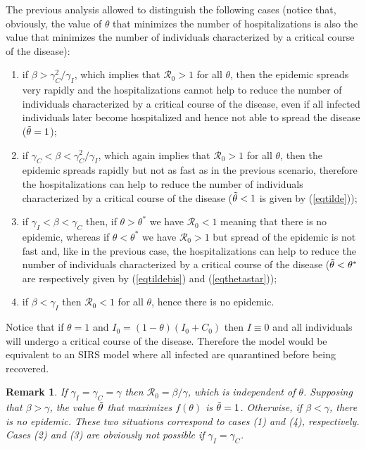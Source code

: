\documentclass[11pt,reqno]{amsart}
\theoremstyle{boldremark}
\newtheorem{remark}{Remark}
\begin{document}
The previous analysis allowed to distinguish the following cases (notice that, obviously, the value of $\theta$ that minimizes the number of hospitalizations is also the value that minimizes the number of individuals characterized by a critical course of the disease): 
\begin{enumerate}
    \item if $\beta > \gamma_C^2/\gamma_I$, which implies that $\mathcal{R}_0>1$ for all $\theta$, then the epidemic spreads very rapidly and the hospitalizations cannot help to reduce the number of individuals characterized by a critical course of the disease, even if all infected individuals later become hospitalized and hence not able to spread the disease ($\Tilde{\theta}=1$); 
    \item if $\gamma_C < \beta < \gamma_C^2/\gamma_I$, which again implies that $\mathcal{R}_0>1$ for all $\theta$, then the epidemic spreads rapidly but not as fast as in the previous scenario, therefore the hospitalizations can help to reduce the number of individuals characterized by a critical course of the disease ($\Tilde{\theta}<1$ is given by (\ref{eqtilde})); 
    \item if $\gamma_I < \beta < \gamma_C$ then, if $\theta>\theta^*$ we have $\mathcal{R}_0 < 1$ meaning that there is no epidemic, whereas if $\theta<\theta^*$ we have $\mathcal{R}_0 > 1$ but spread of the epidemic is not fast and, like in the previous case, the hospitalizations can help to reduce the number of individuals characterized by a critical course of the disease ($\Tilde{\theta} < \theta^*$ are respectively given by (\ref{eqtildebis}) and (\ref{eqthetastar}));
    \item if $\beta < \gamma_I$ then $\mathcal{R}_0 < 1$ for all $\theta$, hence there is no epidemic. 
\end{enumerate}
Notice that if $\theta=1$ and $I_0=(1-\theta)(I_0+C_0)$ then $I \equiv 0$ and all individuals will undergo a critical course of the disease. Therefore the model would be equivalent to an SIRS model where all infected are quarantined before being recovered. 

\begin{remark}
    If $\gamma_I=\gamma_C=\gamma$ then $\mathcal{R}_0=\beta/\gamma$, which is independent of $\theta$. Supposing that $\beta>\gamma$, the value $\Tilde{\theta}$ that maximizes $f(\theta)$ is $\Tilde{\theta}=1$. Otherwise, if $\beta < \gamma$, there is no epidemic. These two situations correspond to cases (1) and (4), respectively. Cases (2) and (3) are obviously not possible if $\gamma_I=\gamma_C$.   
\end{remark}
\end{document}
